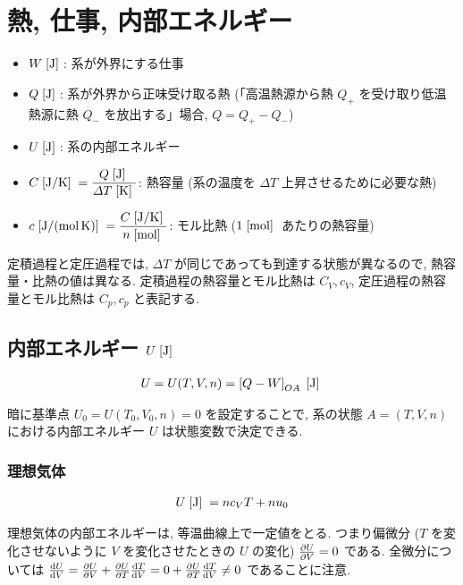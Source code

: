 \documentclass[a4paper,11pt]{jsarticle}
\newcommand{\braunit}[1]{\;\text{[}\unit[per-mode = symbol]{#1}\text{]}\;}
\begin{document}
\section{熱, 仕事, 内部エネルギー}
\begin{itemize}
  \item $W\braunit{\J}$: 系が外界にする仕事
  \item $Q\braunit{\J}$: 系が外界から正味受け取る熱 (「高温熱源から熱 $Q_+$ を受け取り低温熱源に熱 $Q_-$ を放出する」場合, $Q = Q_+ - Q_-$)
  \item $U\braunit{\J}$: 系の内部エネルギー
  \item $C\braunit{\J\per\K} = \dfrac{Q\braunit{\J}}{\varDelta T\braunit{\K}}$: 熱容量 (系の温度を $\varDelta T$ 上昇させるために必要な熱)
  \item $c\braunit{\J\per\mole\per\K} = \dfrac{C\braunit{\J\per\K}}{n\braunit{\mole}}$: モル比熱 ($1\braunit{\mole}$ あたりの熱容量)
\end{itemize}
\par 定積過程と定圧過程では, $\varDelta T$ が同じであっても到達する状態が異なるので, 熱容量・比熱の値は異なる.
定積過程の熱容量とモル比熱は $C_V, c_V$, 定圧過程の熱容量とモル比熱は $C_p, c_p$ と表記する.
\cite[pp.38]{thermo}

\subsection{内部エネルギー \texorpdfstring{$U\braunit{\J}$}{U[J]}}
\begin{align*}
  U = U(T, V, n) = \left[Q - W\right]_{OA} \braunit{\J}
\end{align*}
\par 暗に基準点 $U_0 = U(T_0, V_0, n) = 0$ を設定することで, 系の状態 $A = (T, V, n)$ における内部エネルギー $U$ は状態変数で決定できる.
\cite[pp.65]{thermo}

\subsubsection{理想気体}
\begin{align*}
  U\braunit{\J} = nc_VT + nu_0
\end{align*}
\par 理想気体の内部エネルギーは, 等温曲線上で一定値をとる.
つまり偏微分 ($T$ を変化させないように $V$ を変化させたときの $U$ の変化) $\pdv{U}{V} = 0$ である.
全微分については $\dv{U}{V} = \pdv{U}{V} + \pdv{U}{T}\dv{T}{V} = 0 + \pdv{U}{T}\dv{T}{V} \neq 0$ であることに注意.
\cite[pp.67]{thermo}
\end{document}
